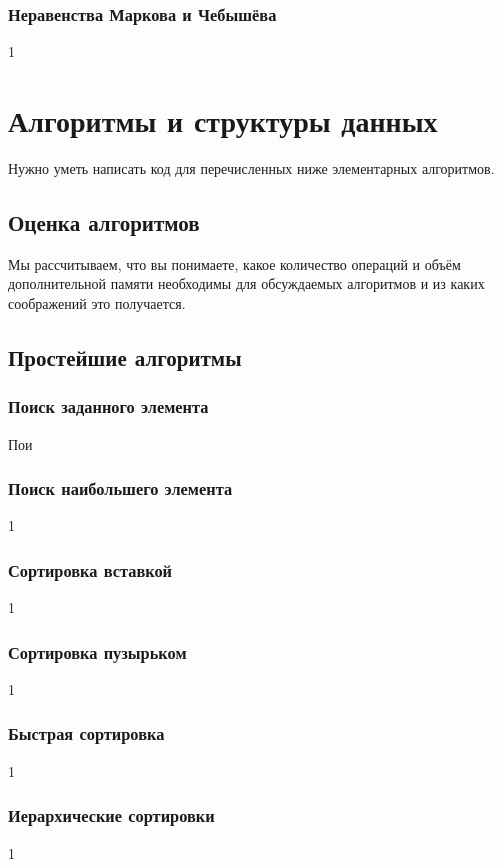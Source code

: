 \documentclass[14pt]{matmex-diploma}
\begin{document}
        \subsubsection*{Неравенства Маркова и Чебышёва}
            1
            
\section{Алгоритмы и структуры данных}

    Нужно уметь написать код для перечисленных ниже элементарных алгоритмов.

    \subsection{Оценка алгоритмов}
    
        Мы рассчитываем, что вы понимаете, какое количество операций и объём дополнительной памяти необходимы для обсуждаемых алгоритмов и из каких соображений это получается.
    
    \subsection{Простейшие алгоритмы}
    
        \subsubsection*{Поиск заданного элемента}
            Пои
        \subsubsection*{Поиск наибольшего элемента}
            1
        \subsubsection*{Сортировка вставкой}
            1
        \subsubsection*{Сортировка пузырьком}
            1
        \subsubsection*{Быстрая сортировка}
            1
        \subsubsection*{Иерархические сортировки}
            1
\end{document}
